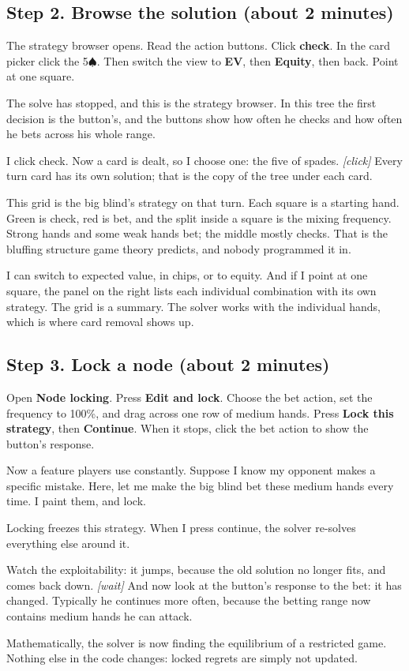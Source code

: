 \documentclass[11pt]{article}
\newcommand{\SP}{\ensuremath{\spadesuit}}\newcommand{\DI}{\ensuremath{\diamondsuit}}\newcommand{\CL}{\ensuremath{\clubsuit}}
\newcommand{\cue}[1]{{\small\itshape\color{black!65}[#1]}}
\begin{document}
\subsection*{Step 2. Browse the solution (about 2 minutes)}
\begin{act}
The strategy browser opens. Read the action buttons. Click \textbf{check}. In the card picker click the
5\SP. Then switch the view to \textbf{EV}, then \textbf{Equity}, then back. Point at one square.
\end{act}
\begin{say}
The solve has stopped, and this is the strategy browser. In this tree the first decision is the button's, and the
buttons show how often he checks and how often he bets across his whole range.

I click check. Now a card is dealt, so I choose one: the five of spades. \cue{click} Every turn card has its own
solution; that is the copy of the tree under each card.

This grid is the big blind's strategy on that turn. Each square is a starting hand. Green is check, red is bet, and
the split inside a square is the mixing frequency. Strong hands and some weak hands bet; the middle mostly checks.
That is the bluffing structure game theory predicts, and nobody programmed it in.

I can switch to expected value, in chips, or to equity. And if I point at one square, the panel on the right lists
each individual combination with its own strategy. The grid is a summary. The solver works with the individual
hands, which is where card removal shows up.
\end{say}

\subsection*{Step 3. Lock a node (about 2 minutes)}
\begin{act}
Open \textbf{Node locking}. Press \textbf{Edit and lock}. Choose the bet action, set the frequency to 100\%, and
drag across one row of medium hands. Press \textbf{Lock this strategy}, then \textbf{Continue}. When it stops,
click the bet action to show the button's response.
\end{act}
\begin{say}
Now a feature players use constantly. Suppose I know my opponent makes a specific mistake. Here, let me make the big
blind bet these medium hands every time. I paint them, and lock.

Locking freezes this strategy. When I press continue, the solver re-solves everything else around it.

Watch the exploitability: it jumps, because the old solution no longer fits, and comes back down. \cue{wait} And
now look at the button's response to the bet: it has changed. Typically he continues more often, because the
betting range now contains medium hands he can attack.

Mathematically, the solver is now finding the equilibrium of a restricted game. Nothing else in the code changes:
locked regrets are simply not updated.
\end{say}
\end{document}
